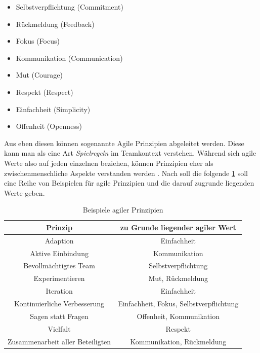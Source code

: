 \begin{itemize}[noitemsep, topsep=0pt]
	\item Selbstverpflichtung (Commitment)
	\item Rückmeldung (Feedback)
	\item Fokus (Focus)
	\item Kommunikation (Communication) 
	\item Mut (Courage)
	\item Respekt (Respect)
	\item Einfachheit (Simplicity)
	\item Offenheit (Openness)
\end{itemize}

Aus eben diesen können sogenannte Agile Prinzipien abgeleitet werden. Diese kann man als eine Art \textit{Spielregeln} im Teamkontext verstehen. Während sich agile Werte also auf jeden einzelnen beziehen, können Prinzipien eher als zwischenmenschliche Aspekte verstanden werden \cite[S. 12]{hofert_agiler_2016}. Nach  soll die folgende \ref{tab:agileprinzipien} soll eine Reihe von Beispielen für agile Prinzipien und die darauf zugrunde liegenden Werte geben.

\begin{table}[htbp]
	\caption{Beispiele agiler Prinzipien}
	\begin{center}
			\begin{tabular}{|c|c|}
				\hline
				\textbf{Prinzip} & \textbf{zu Grunde liegender agiler Wert}\\
				\hline
				Adaption & Einfachheit \\
				Aktive Einbindung & Kommunikation\\
				Bevollmächtigtes Team & Selbstverpflichtung \\
				Experimentieren & Mut, Rückmeldung \\
				Iteration &  Einfachheit \\
				Kontinuierliche Verbesserung & Einfachheit, Fokus, Selbstverpflichtung \\
				Sagen statt Fragen & Offenheit, Kommunikation \\
				Vielfalt & Respekt \\
				Zusammenarbeit aller Beteiligten & Kommunikation, Rückmeldung \\
				\hline
			\end{tabular}
		\label{tab:agileprinzipien}
	\end{center}
\end{table}

